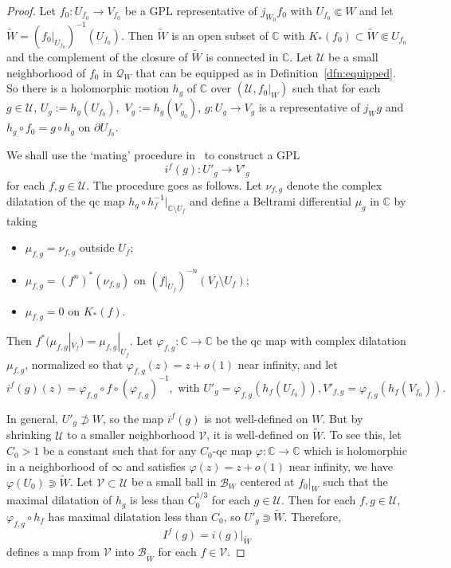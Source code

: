 \documentclass{amsart}
\numberwithin{equation}{section}
\newcommand{\C}{\mathbb C}
\theoremstyle{definition}
\theoremstyle{remark}
\begin{document}
\begin{proof} 
Let $f_0:U_{f_0}\to V_{f_0}$ be a GPL representative of $j_{W_0}f_0$ with $U_{f_0}\Subset W$ and let $\widetilde{W}=(f_0|_{U_{f_0}})^{-1} (U_{f_0})$. Then $\widetilde{W}$ is an open subset of $\C$ with $K_*(f_0)\subset \widetilde{W}\Subset U_{f_0}$ and the complement of the closure of $\widetilde{W}$ is connected in $\C$. Let $\mathcal{U}$ be a small neighborhood of $f_0$ in $\mathcal{Q}_W$ that can be equipped as in Definition~\ref{dfn:equipped}. So there is a holomorphic motion $h_g$ of $\C$ over $(\mathcal{U}, f_0|_W)$ such that for each $g\in \mathcal{U}$, $U_g:=h_g(U_{f_0}),$ $V_g:=h_g(V_{g_0})$, $g:U_g\to V_g$ is a representative of $j_{W}g$ and $h_g\circ f_0=g\circ h_g$ on $\partial U_{f_0}$.


We shall use the `mating' procedure in~\cite{DH2} to construct a GPL $$i^f(g): U'_g\to V'_g$$ for each $f,g\in \mathcal{U}$. The procedure goes as follows.
Let $\nu_{f,g}$ denote the complex dilatation of the qc map $h_g\circ h_f^{-1}|_{\C\setminus U_f}$ and define a Beltrami differential $\mu_g$ in $\mathbb{C}$ by taking
\begin{itemize}
\item $\mu_{f,g}=\nu_{f,g}$ outside $U_f$;
\item $\mu_{f,g}=(f^n)^*(\nu_{f,g})$ on $(f|_{U_f})^{-n}(V_{f}\setminus U_f)$; 
\item $\mu_{f,g}=0$ on $K_*(f)$.
\end{itemize}
Then $f^*(\mu_{f,g}|_{V_{f}})=\mu_{f,g}|_{U_f}$.
Let $\varphi_{f,g}:\mathbb{C}\to \mathbb{C}$ be the qc map with complex dilatation $\mu_{f,g}$, normalized so that $\varphi_{f,g}(z)=z+o(1)$ near infinity, and let  
$$i^f(g)(z)=\varphi_{f,g}\circ f\circ (\varphi_{f,g})^{-1}, \text{ with }U'_{g}=\varphi_{f,g}(h_f(U_{f_0})), V'_{f,g}=\varphi_{f,g}(h_f(V_{f_0})).$$

In general, $U'_g\not\supset W$, so the map $i^f(g)$ is not well-defined on $W$. But by shrinking $\mathcal{U}$ to a smaller neighborhood $\mathcal{V}$, it is  well-defined on $\widetilde{W}$.
To see this, let $C_0>1$ be a constant such that for any $C_0$-qc map $\varphi:\C\to \C$ which is holomorphic in a neighborhood of $\infty$ and satisfies $\varphi(z)=z+o(1)$ near infinity, we have $\varphi(U_0)\Supset\widetilde{W}$. 
Let $\mathcal{V}\subset \mathcal{U}$ be a small ball in $\mathcal{B}_W$ centered at $f_0|_W$ such that the maximal dilatation of $h_g$ is less than $C_0^{1/3}$ for each $g\in \mathcal{U}$. Then for each $f,g\in \mathcal{U}$, $\varphi_{f,g}\circ h_f$ has maximal dilatation less than $C_0$, so $U'_{g}\Supset \widetilde{W}$. Therefore, 
$$I^f(g)=i(g)|_{\widetilde{W}}$$
defines a map from $\mathcal{V}$ into $\mathcal{B}_{\widetilde{W}}$ for each $f\in \mathcal{V}$. 


\end{proof}
\end{document}
